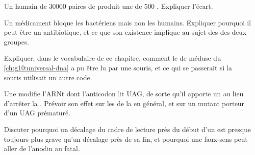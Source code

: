 \begin{exercise}[$\star\star$]\label{exo:g11:gene-expression:11}
Un  humain de \num{30000} paires de  produit une  de
500 . Expliquer l'écart.
\end{exercise}

\begin{exercise}[$\star\star\star$]\label{exo:g11:gene-expression:12}
Un médicament bloque les  bactériens mais non les 
humains. Expliquer pourquoi il peut être un antibiotique, et ce que son
existence implique au sujet des  des deux groupes.
\end{exercise}

\begin{exercise}[$\star\star\star$]\label{exo:g11:gene-expression:13}
Expliquer, dans le vocabulaire de ce chapitre, comment le  de
méduse du \cref{ch:g10:universal-dna} a pu être lu par une souris, et
ce qui se passerait si la souris utilisait un autre code.
\end{exercise}

\begin{exercise}[$\star\star\star$]\label{exo:g11:gene-expression:14}
Une  modifie l'ARNt dont l'anticodon lit UAG, de sorte qu'il
apporte un  au lieu d'arrêter la . Prévoir son
effet sur les  de la  en général, et sur un  mutant
porteur d'un UAG prématuré.
\end{exercise}

\begin{exercise}[$\star\star\star$]\label{exo:g11:gene-expression:15}
Discuter pourquoi un décalage du cadre de lecture près du début d'un
 est presque toujours plus grave qu'un décalage près de sa fin, et
pourquoi une  faux-sens peut aller de l'anodin au fatal.
\end{exercise}

